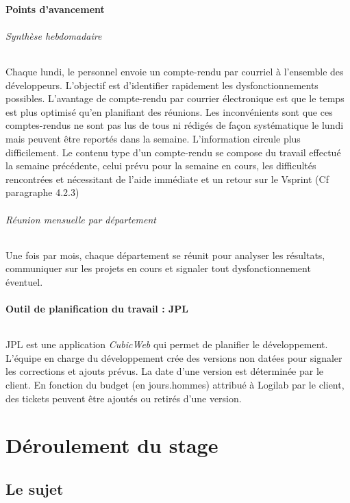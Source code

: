 \documentclass {report}
\begin{document}
\subsection{Points d'avancement}
\paragraph{Synthèse hebdomadaire}
Chaque lundi, le personnel envoie un compte-rendu par courriel à l'ensemble des développeurs. L'objectif est d'identifier rapidement les dysfonctionnements possibles. L'avantage de compte-rendu par courrier électronique est que le temps est plus optimisé qu'en planifiant des réunions. Les inconvénients sont que ces comptes-rendus ne sont pas lus de tous ni rédigés de façon systématique le lundi mais peuvent être reportés dans la semaine. L'information circule plus difficilement. Le contenu type d'un compte-rendu se compose du travail effectué la semaine précédente, celui prévu pour la semaine en cours, les difficultés rencontrées et nécessitant de l'aide immédiate et un retour sur le Vsprint (Cf paragraphe 4.2.3)
\paragraph{Réunion mensuelle par département}
Une fois par mois, chaque département se réunit pour analyser les résultats, communiquer sur les projets en cours et signaler tout dysfonctionnement éventuel.
\subsection{Outil de planification du travail : JPL}
\paragraph{}
JPL est une application \textit{CubicWeb} qui permet de planifier le développement. L'équipe en charge du développement crée des versions non datées pour signaler les corrections et ajouts prévus. La date d'une version est déterminée par le client. En fonction du budget (en jours.hommes) attribué à Logilab par le client, des tickets peuvent être ajoutés ou retirés d'une version.





\part{Déroulement du stage}
\chapter{Le sujet}
\end{document}
